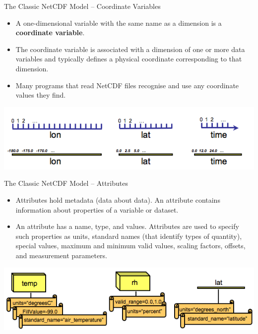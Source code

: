 \documentclass[compress,11pt,xcolor=svgnames,aspectratio=169]{beamer}
\begin{document}
\begin{frame}[fragile]{The Classic NetCDF Model -- Coordinate Variables}

\begin{itemize}
\setlength\itemsep{0.4cm}

  \item A one-dimensional variable with the same name as a dimension is a \textbf{coordinate variable}.

  \item The coordinate variable is associated with a dimension of one or more data variables and typically defines a physical coordinate corresponding to that dimension.

  \item Many programs that read NetCDF files recognise and use any coordinate values they find.

\end{itemize}

\begin{center}
\includegraphics[scale=0.5]{fig/nccoords}
\end{center}

\nocite{netcdf}

\end{frame}

\begin{frame}[fragile]{The Classic NetCDF Model -- Attributes}

\begin{itemize}
\setlength\itemsep{0.4cm}

  \item Attributes hold metadata (data about data). An attribute contains information about properties of a variable or dataset.

  \item An attribute has a name, type, and values. Attributes are used to specify such properties as units, standard names (that identify types of quantity), special values, maximum and minimum valid values, scaling factors, offsets, and measurement parameters.

\end{itemize}

\begin{center}
\includegraphics[scale=0.5]{fig/ncatts}
\end{center}

\nocite{netcdf}

\end{frame}
\end{document}
